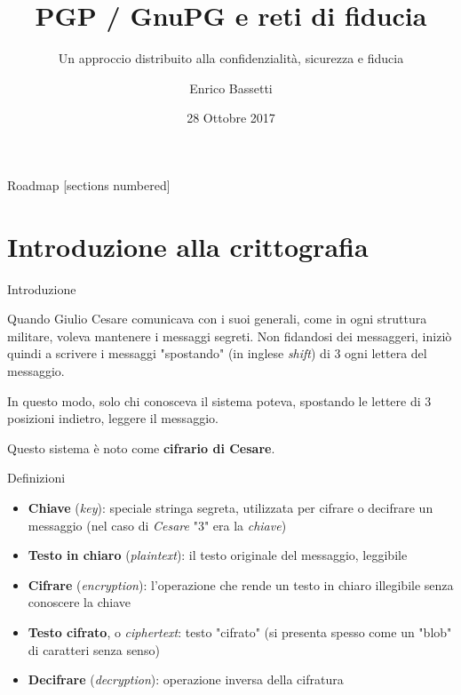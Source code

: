 \documentclass[10pt]{beamer}
\title{PGP / GnuPG e reti di fiducia}
\subtitle{Un approccio distribuito alla confidenzialità, sicurezza e fiducia}
\date{28 Ottobre 2017}
\author{Enrico Bassetti}
\institute{Latina Linux User Group}
\begin{document}

\maketitle

\begin{frame}{Roadmap}
  [sections numbered]
  \tableofcontents[hideallsubsections]
\end{frame}

\section{Introduzione alla crittografia}

\begin{frame}[fragile]{Introduzione}

Quando Giulio Cesare comunicava con i suoi generali, come in ogni struttura
militare, voleva mantenere i messaggi segreti. Non fidandosi dei messaggeri,
iniziò quindi a scrivere i messaggi "spostando" (in inglese \textit{shift}) di 3
ogni lettera del messaggio.

In questo modo, solo chi conosceva il sistema poteva, spostando le lettere di
3 posizioni indietro, leggere il messaggio.

Questo sistema è noto come \textbf{cifrario di Cesare}.

\end{frame}

\begin{frame}[fragile]{Definizioni}
\begin{itemize}
\item \textbf{Chiave} (\textit{key}): speciale stringa segreta, utilizzata per cifrare o decifrare un messaggio (nel caso di \textit{Cesare} "3" era la \textit{chiave})
\item \textbf{Testo in chiaro} (\textit{plaintext}): il testo originale del messaggio, leggibile
\item \textbf{Cifrare} (\textit{encryption}): l'operazione che rende un testo in chiaro illegibile senza conoscere la chiave
\item \textbf{Testo cifrato}, o \textit{ciphertext}: testo "cifrato" (si presenta spesso come un "blob" di caratteri senza senso)
\item \textbf{Decifrare} (\textit{decryption}): operazione inversa della cifratura
\end{itemize}
\end{frame}
\end{document}
